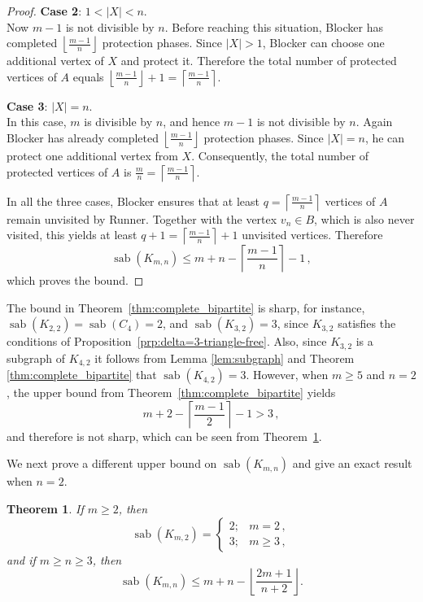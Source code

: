\documentclass[12pt]{article}
\newtheorem{theorem}{Theorem}[section]
\DeclareMathOperator{\sab}{\mathrm{sab}}
\begin{document}
\begin{proof}
\medskip\noindent
{\bf Case 2}: $1<|X|<n$. \\
Now $m-1$ is not divisible by $n$. Before reaching this situation, Blocker has completed $\left\lfloor\frac{m-1}{n}\right\rfloor$
protection phases. Since $|X|>1$, Blocker can choose one additional vertex of $X$ and protect it. Therefore the total number of protected vertices of $A$ equals $\left\lfloor\frac{m-1}{n}\right\rfloor+1=\left\lceil\frac{m-1}{n}\right\rceil$.

\medskip\noindent
{\bf Case 3}: $|X|=n$. \\
In this case, $m$ is divisible by $n$, and hence $m-1$ is not divisible by $n$. Again Blocker has already completed $\left\lfloor\frac{m-1}{n}\right\rfloor$ protection phases. Since $|X|=n$, he can protect one additional vertex from $X$. Consequently, the total number of protected vertices of $A$ is $\frac{m}{n}=\left\lceil\frac{m-1}{n}\right\rceil$.

\medskip

In all the three cases, Blocker ensures that at least $q=\left\lceil\frac{m-1}{n}\right\rceil$ vertices of $A$ remain unvisited by Runner. Together with the vertex $v_n\in B$, which is also never visited, this yields at least $q+1=\left\lceil\frac{m-1}{n}\right\rceil+1$ unvisited vertices. Therefore
$$\sab(K_{m,n}) \le m+n-\left\lceil\frac{m-1}{n}\right\rceil-1\,,$$
which proves the bound.
\end{proof}

The bound in Theorem~\ref{thm:complete_bipartite} is sharp, for instance, $\sab(K_{2,2})=\sab(C_4)=2$, and $\sab(K_{3,2})=3$, since $K_{3,2}$ satisfies the conditions of Proposition~\ref{prp:delta=3-triangle-free}. 
Also, since $K_{3,2}$ is a subgraph of $K_{4,2}$ it follows from Lemma \ref{lem:subgraph} and Theorem \ref{thm:complete_bipartite} that $\sab(K_{4,2})=3$. However, when $m \ge 5$ and $n=2$, the upper bound from Theorem~\ref{thm:complete_bipartite} yields
$$m+2-\left\lceil \frac{m-1}{2} \right\rceil - 1 > 3\,,$$ and therefore is not sharp, which can be seen from Theorem~\ref{thm:complete_bipartite_new}. 

We next prove a different upper bound on $\sab(K_{m,n})$ and give an exact result when $n=2$. 

\begin{theorem}
\label{thm:complete_bipartite_new}
If $m \ge 2$, then
$$\sab(K_{m,2}) =  
\begin{cases}
2; & m=2\,,\\[5pt]
3; & m \ge 3\,,
\end{cases}$$
and if  $m \geq n \ge 3$, then
$$\sab(K_{m,n}) \leq m+n-\left\lfloor \frac{2m+1}{n+2} \right\rfloor .$$
\end{theorem}
\end{document}
